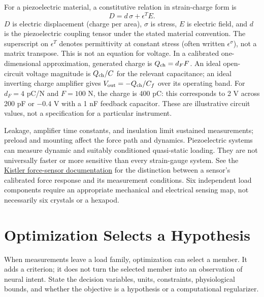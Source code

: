 For a piezoelectric material, a constitutive relation in strain-charge form is
\begin{equation}
 D=d\,\sigma+\epsilon^T E.
 \label{eq:piezoelectric_relation}
\end{equation}
$D$ is electric displacement (charge per area), $\sigma$ is stress, $E$ is
electric field, and $d$ is the piezoelectric coupling tensor under the stated
material convention. The superscript on $\epsilon^{T}$ denotes permittivity at
constant stress (often written $\epsilon^{\sigma}$), not a matrix transpose.
This is not an equation for voltage. In a calibrated
one-dimensional approximation, generated charge is $Q_{\rm ch}=d_FF$. An ideal
open-circuit voltage magnitude is $Q_{\rm ch}/C$ for the relevant capacitance; an
ideal inverting charge amplifier gives $V_{\rm out}=-Q_{\rm ch}/C_f$ over its operating
band. For $d_F=4$ pC/N and $F=100$ N, the charge is 400 pC: this corresponds
to 2 V across 200 pF or $-0.4$ V with a 1 nF feedback capacitor. These are
illustrative circuit values, not a specification for a particular instrument.

Leakage, amplifier time constants, and insulation limit sustained measurements;
preload and mounting affect the force path and dynamics. Piezoelectric systems
can measure dynamic and suitably conditioned quasi-static loading. They are
not universally faster or more sensitive than every strain-gauge system.
See the \href{https://www.kistler.com/GB/en/cp/piezoelectric-force-sensors-9224a/P0001619}{Kistler force-sensor documentation}
for the distinction between a sensor's calibrated force response and its
measurement conditions. Six independent load components require an appropriate
mechanical and electrical sensing map, not necessarily six crystals or a hexapod.

\section{Optimization Selects a Hypothesis}
\label{subsec:approach_optimization}

When measurements leave a load family, optimization can select a member. It
adds a criterion; it does not turn the selected member into an observation of
neural intent. State the decision variables, units, constraints, physiological
bounds, and whether the objective is a hypothesis or a computational regularizer.

